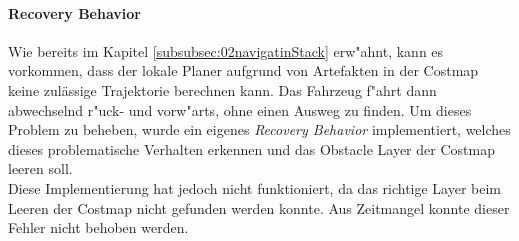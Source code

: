 \paragraph{Recovery Behavior}
Wie bereits im Kapitel \ref{subsubsec:02navigatinStack} erw"ahnt, kann es vorkommen, dass der lokale Planer aufgrund von Artefakten in der Costmap keine zul\"assige Trajektorie berechnen kann. Das Fahrzeug f"ahrt dann abwechselnd r"uck- und vorw"arts, ohne einen Ausweg zu finden. Um dieses Problem zu beheben, wurde ein eigenes \emph{Recovery Behavior} implementiert, welches dieses problematische Verhalten erkennen und das Obstacle Layer der Costmap leeren soll.\\
Diese Implementierung hat jedoch nicht funktioniert, da das richtige Layer beim Leeren der Costmap nicht gefunden werden konnte. Aus Zeitmangel konnte dieser Fehler nicht behoben werden.